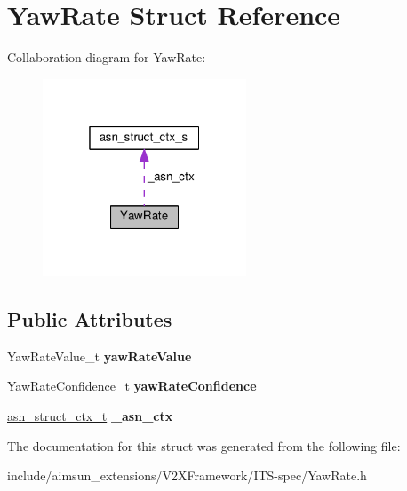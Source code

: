 \hypertarget{structYawRate}{}\section{Yaw\+Rate Struct Reference}
\label{structYawRate}


Collaboration diagram for Yaw\+Rate\+:\nopagebreak
\begin{figure}[H]
\begin{center}
\leavevmode
\includegraphics[width=172pt]{structYawRate__coll__graph}
\end{center}
\end{figure}
\subsection*{Public Attributes}
\begin{DoxyCompactItemize}
\item 
Yaw\+Rate\+Value\+\_\+t {\bfseries yaw\+Rate\+Value}\hypertarget{structYawRate_a5b18fdfe21122602f80f0ffd2713c114}{}\label{structYawRate_a5b18fdfe21122602f80f0ffd2713c114}

\item 
Yaw\+Rate\+Confidence\+\_\+t {\bfseries yaw\+Rate\+Confidence}\hypertarget{structYawRate_a69e73154fbdf977eaaa0b77b87421a11}{}\label{structYawRate_a69e73154fbdf977eaaa0b77b87421a11}

\item 
\hyperlink{structasn__struct__ctx__s}{asn\+\_\+struct\+\_\+ctx\+\_\+t} {\bfseries \+\_\+asn\+\_\+ctx}\hypertarget{structYawRate_a187f8a3088240cab4fb4513b77d584f1}{}\label{structYawRate_a187f8a3088240cab4fb4513b77d584f1}

\end{DoxyCompactItemize}


The documentation for this struct was generated from the following file\+:\begin{DoxyCompactItemize}
\item 
include/aimsun\+\_\+extensions/\+V2\+X\+Framework/\+I\+T\+S-\/spec/Yaw\+Rate.\+h\end{DoxyCompactItemize}
